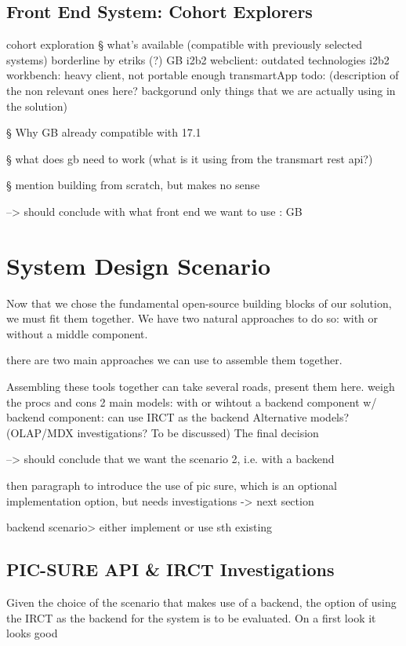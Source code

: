 \subsection{Front End System: Cohort Explorers}

cohort exploration
§ what's available (compatible with previously selected systems)
borderline by etriks (?)
GB
i2b2 webclient: outdated technologies
i2b2 workbench: heavy client, not portable enough
transmartApp 
todo: (description of the non relevant ones here? backgorund only things that we are actually using in the solution)

§ Why GB 
already compatible with 17.1

§ what does gb need to work (what is it using from the transmart rest api?)

§ mention building from scratch, but makes no sense

--> should conclude with what front end we want to use : GB

\section{System Design Scenario}
Now that we chose the fundamental open-source building blocks of our solution, we must fit them together.
We have two natural approaches to do so: with or without a middle component.

there are two main approaches we can use to assemble them together.


Assembling these tools together can take several roads, present them here.
weigh the procs and cons
2 main models: with or wihtout a backend component
w/ backend component: can use IRCT as the backend
Alternative models? (OLAP/MDX investigations? To be discussed)
The final decision

--> should conclude that we want the scenario 2, i.e. with a backend

then paragraph to introduce the use of pic sure, which is an optional implementation option, but needs investigations -> next section

backend scenario> either implement or use sth existing


\subsection{PIC-SURE API \& IRCT Investigations}

Given the choice of the scenario that makes use of a backend, the option of using the IRCT as the backend for the system is to be evaluated.
On a first look it looks good 

